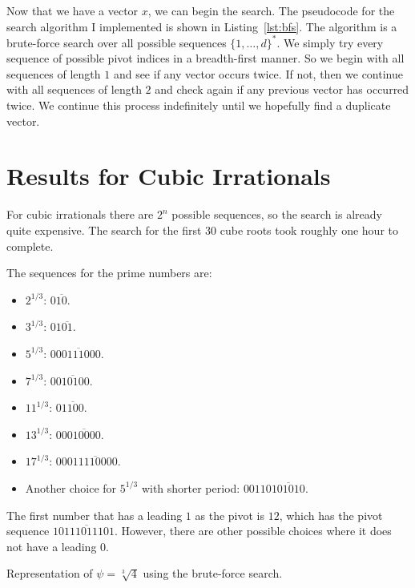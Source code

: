 Now that we have a vector $x$, we can begin the search.
The pseudocode for the search algorithm I implemented is shown in Listing~\ref{lst:bfs}.
The algorithm is a brute-force search over all possible sequences $\{1,\dots,d\}^*$.
We simply try every sequence of possible pivot indices in a breadth-first manner.
So we begin with all sequences of length $1$ and see if any vector occurs twice.
If not, then we continue with all sequences of length $2$ and check again if
any previous vector has occurred twice.
We continue this process indefinitely until we hopefully find a duplicate vector.

\section{Results for Cubic Irrationals}

For cubic irrationals there are $2^n$ possible sequences,
so the search is already quite expensive.
The search for the first 30 cube roots took roughly one hour to complete.

\begin{example}
  The sequences for the prime numbers are:
  \begin{itemize}
    \item $2^{1/3}$: $0\overline{10}$.
    \item $3^{1/3}$: $01\overline{01}$.
    \item $5^{1/3}$: $0\overline{00111000}$.
    \item $7^{1/3}$: $0\overline{010100}$.
    \item $11^{1/3}$: $0\overline{1100}$.
    \item $13^{1/3}$: $00\overline{010000}$.
    \item $17^{1/3}$: $000\overline{11110000}$.
    \item Another choice for $5^{1/3}$ with shorter period: $00110\overline{101010}$.
  \end{itemize}
\end{example}

\begin{remark}
  The first number that has a leading $1$ as the pivot is $12$,
  which has the pivot sequence $1\overline{0111011101}$.
  However, there are other possible choices where it does not have a leading $0$.
\end{remark}

\begin{table}[t]
  \caption{Representation of $ψ = \sqrt[3]{4}$ using the brute-force search.}
  \label{table:cube-root-4}
  \centering
  
\end{table}

